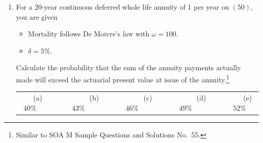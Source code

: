 \documentclass[11pt,fleqn,oneside]{book}
\begin{document}
\begin{enumerate}
\item For a 20-year continuous deferred whole life annuity of 1 per year on $(50)$, you are given
\begin{itemize}
\item Mortality follows De Moivre's law with $\omega = 100$.
\item $\delta=5\%$.
\end{itemize}
Calculate the probability that the sum of the annuity payments actually made will exceed the actuarial present value at issue of the annuity.\footnote[3]{Similar to SOA M Sample Questions and Solutions No.\ 55.}

\vspace{0.1cm}
\begin{center}
\small
\begin{tabular}{c c c c c}
(a) $40\%\;\;\;\;\;\;\;\;$ & 
$\;\;\;\;\;\;\;\;$(b) $43\%\;\;\;\;\;\;\;\;$ &
$\;\;\;\;\;\;\;\;$(c) $46\%\;\;\;\;\;\;\;\;$ & 
$\;\;\;\;\;\;\;\;$(d) $49\%\;\;\;\;\;\;\;\;$ &
$\;\;\;\;\;\;\;\;$(e) $52\%$
\end{tabular}
\normalsize
\end{center}
\end{enumerate}

\newpage
\end{document}
